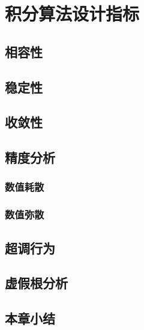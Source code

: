 \chapter{积分算法设计指标}

\section{相容性}

\section{稳定性}

\section{收敛性}

\section{精度分析}

\subsection{数值耗散}

\subsection{数值弥散}

\section{超调行为}

\section{虚假根分析}

\section{本章小结}



